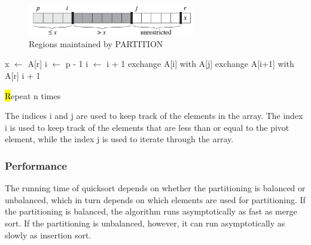 \vspace{-1em}

\begin{figure}[H]
    \centering
    \includegraphics[width=0.65\textwidth]{assets/quicksort_areas.png}
    \caption{Regions maintained by PARTITION  \cite{cormen2022introduction}}
\end{figure}

\vspace{-0.7em}

\begin{algorithm}[H]
    \caption{Partition (A, p, r)}
    \begin{algorithmic}[1]
        \State x $\gets$ A[r] 
        \State i $\gets$ p - 1
                \State i $\gets$ i + 1
                \State exchange A[i] with A[j]
            \EndIf
        \EndFor
        \State exchange A[i+1] with A[r]
        \State \Return i + 1
    \end{algorithmic}
    \hl
    Repeat n times
\end{algorithm}

\begin{observationblock}[i, j values]
The indices i and j are used to keep track of the elements in the array. The index i is used to keep track of the elements that are less than or equal to the pivot element, while the index j is used to iterate through the array.
\end{observationblock}

\subsubsection*{Performance}

The running time of quicksort depends on whether the partitioning is balanced or
unbalanced, which in turn depends on which elements are used for partitioning.
If the partitioning is balanced, the algorithm runs asymptotically as fast as merge
sort. If the partitioning is unbalanced, however, it can run asymptotically as slowly
as insertion sort.

